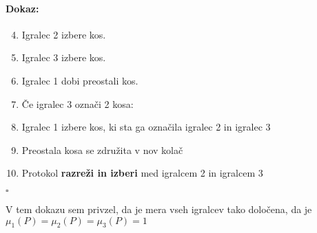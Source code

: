 \documentclass[a4paper, 12pt]{article}
\newenvironment{dokaz}{\paragraph{Dokaz:}}{\hfill$\square$\\}
\begin{document}
\begin{dokaz}
\begin{enumerate}
			\setcounter{enumi}{3}
			
			\item \qquad \qquad Igralec 2 izbere kos.
			
			\item \qquad \qquad Igralec 3 izbere kos.
			
			\item \qquad \qquad Igralec 1 dobi preostali kos.
			
			\item[] \qquad Če igralec 3 označi 2 kosa:
			
			\setcounter{enumi}{3}
			
			\item \qquad \qquad Igralec 1 izbere kos, ki sta ga označila igralec 2 in igralec 3
			
			\item \qquad \qquad Preostala kosa se združita v nov kolač
			
			\item \qquad \qquad Protokol \textbf{razreži in izberi} med igralcem 2 in igralcem 3
			
		\end{enumerate}
	\end{dokaz}

	V tem dokazu sem privzel, da je mera vseh igralcev tako določena, da je $\mu_1 (P) = \mu_2 (P) = \mu_3 (P) = 1$
\end{document}
